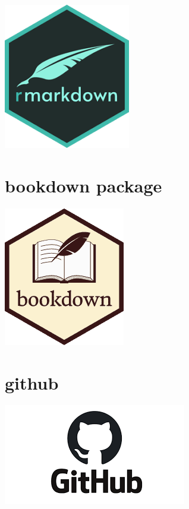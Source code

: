 \documentclass[
]{book}
\begin{document}
\begin{center}\includegraphics{_images/rmarkdown} \end{center}

\hypertarget{bookdown-package}{%
\section{bookdown package}\label{bookdown-package}}

\begin{center}\includegraphics{_images/bookdown} \end{center}

\hypertarget{github}{%
\section{github}\label{github}}

\begin{center}\includegraphics{_images/github} \end{center}
\end{document}
